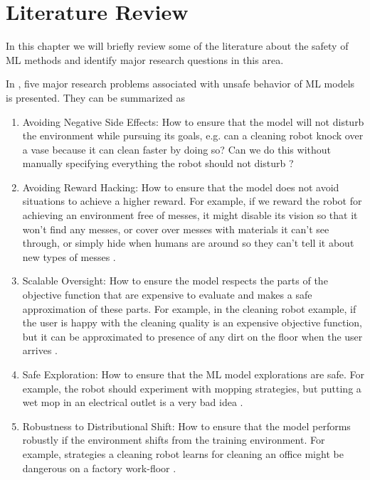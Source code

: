 \chapter{Literature Review}

In this chapter we will briefly review some of the literature about the safety of ML methods and identify major research questions in this area. 

In \cite{Amodei}, five major research problems associated with unsafe behavior of ML models is presented. They can be summarized as
\begin{enumerate}
	\item Avoiding Negative Side Effects: How to ensure that the model will not disturb the environment while pursuing its goals, e.g. can a cleaning robot knock over a vase because it can clean faster by doing so? Can we do this without manually specifying everything the robot should not disturb \cite{Amodei}?
	
	\item Avoiding Reward Hacking: How to ensure that the model does not avoid situations to achieve a higher reward. For example, if we reward the robot for achieving an environment free of messes, it might disable its vision so that it won’t find any messes, or cover over messes with materials it can’t see through, or simply hide when humans are around so they can’t tell it about new types of messes \cite{Amodei}. 
	
	\item Scalable Oversight: How to ensure the model respects the parts of the objective function that are expensive to evaluate and makes a safe approximation of these parts. 
	For example, in the cleaning robot example, if the user is happy with the cleaning quality is an expensive objective function, but it can be approximated to presence of any dirt on the floor when the user arrives \cite{Amodei}. 
	
	\item Safe Exploration: How to ensure that the ML model explorations are safe. For example, the robot should experiment with mopping strategies, but putting a wet mop in an electrical outlet is a very bad idea \cite{Amodei}. 
	
	\item Robustness to Distributional Shift: How to ensure that the model performs robustly if the environment shifts from the training environment. For example, strategies a cleaning robot learns for cleaning an office might be dangerous on a factory work-floor \cite{Amodei}.

\end{enumerate}

